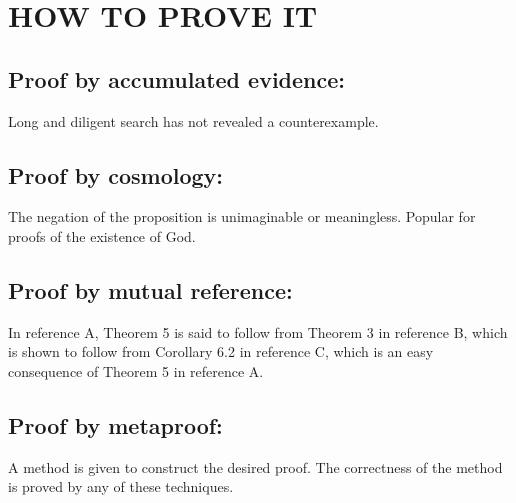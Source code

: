 \chapter{\texorpdfstring{HOW TO PROVE IT}{}} %
\setcounter{equation}{0} 

\section{Proof by accumulated evidence:}

	Long and diligent search has not revealed a counterexample.

\section{Proof by cosmology:}

	The negation of the proposition is unimaginable or
	meaningless. Popular for proofs of the existence of God.

\section{Proof by mutual reference:}

	In reference A, Theorem 5 is said to follow from Theorem 3 in
	reference B, which is shown to follow from Corollary 6.2 in
	reference C, which is an easy consequence of Theorem 5 in
	reference A.

\section{Proof by metaproof:}

	A method is given to construct the desired proof. The
	correctness of the method is proved by any of these
	techniques.
